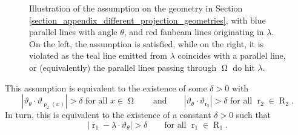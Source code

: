\documentclass[12pt]{article}
\DeclareMathOperator{\rayvariable}{r}
\DeclareMathOperator{\raygroundset}{R}
\DeclareMathOperator{\rayinverse}{\rho}
\DeclareMathOperator{\imgdom}{{\Omega}}
\begin{document}
\begin{figure}
\caption{Illustration of the assumption on the geometry in Section \ref{section_appendix_different_projection_geometries}, with blue parallel lines with angle $\theta$, and red fanbeam lines originating in $\lambda$. On the left, the assumption is satisfied, while on the right, it is violated as the teal line emitted from $\lambda$ coincides with a parallel line, or (equivalently) the parallel lines passing through $\imgdom$ do hit $\lambda$.
}
\label{fig_mixed_proj}
\end{figure}

This assumption is equivalent to the existence of some $\delta>0$ with 
\begin{equation}\label{equ_mixed_projectoin_Omega}
|\vartheta_\theta \cdot \vartheta_{\rayinverse_2(x)}|>\delta \text{ for all }x \in \imgdom \qquad \text{and} \qquad |\vartheta_\theta \cdot \vartheta_{\rayvariable_2}| > \delta \text{ for all }\rayvariable_2 \in \raygroundset_2.
\end{equation}
In turn, this is equivalent to the existence of a constant $\delta>0$ such that
\begin{equation} \label{equ_mixed_projectoin_Omega_2}
|\rayvariable_1-\lambda\cdot \vartheta_\theta|>\delta \qquad \text{for all }\rayvariable_1 \in \raygroundset_1.
\end{equation}
 
\end{document}
